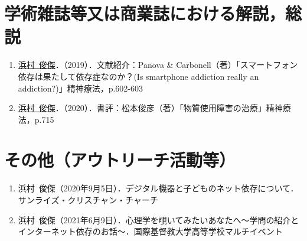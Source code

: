\documentclass{article}
\begin{document}
\section{学術雑誌等又は商業誌における解説，総説}
\begin{enumerate}
	\item \underline{浜村\ 俊傑}．（2019）．文献紹介：Panova \& Carbonell（著）「スマートフォン依存は果たして依存症なのか？(Is smartphone addiction really an addiction?)」精神療法，p.602-603
	\item \underline{浜村\ 俊傑}．（2020）．書評：松本俊彦（著）「物質使用障害の治療」精神療法，p.715
\end{enumerate}

\section{その他（アウトリーチ活動等）}
\begin{enumerate}
	\item 浜村\ 俊傑（2020年9月5日）．デジタル機器と子どものネット依存について．サンライズ・クリスチャン・チャーチ
	\item 浜村\ 俊傑（2021年6月9日）．心理学を覗いてみたいあなたへ〜学問の紹介とインターネット依存のお話〜．国際基督教大学高等学校マルチイベント
\end{enumerate}
\end{document}
